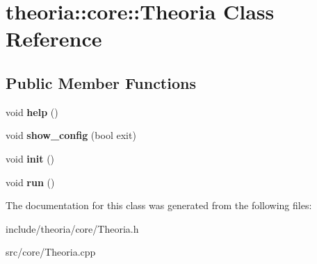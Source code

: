 \hypertarget{classtheoria_1_1core_1_1Theoria}{}\section{theoria\+:\+:core\+:\+:Theoria Class Reference}
\label{classtheoria_1_1core_1_1Theoria}
\subsection*{Public Member Functions}
\begin{DoxyCompactItemize}
\item 
\mbox{\label{classtheoria_1_1core_1_1Theoria_ae8537946e39ac2ec084332edd6ef0a9a}} 
void {\bfseries help} ()
\item 
\mbox{\label{classtheoria_1_1core_1_1Theoria_a353a71a3b26b77d814c99756a749bbdf}} 
void {\bfseries show\+\_\+config} (bool exit)
\item 
\mbox{\label{classtheoria_1_1core_1_1Theoria_a7c08abec5d2655e8779f81622406ccb7}} 
void {\bfseries init} ()
\item 
\mbox{\label{classtheoria_1_1core_1_1Theoria_a2792aa50eb3ec9a2bea5288097052a3f}} 
void {\bfseries run} ()
\end{DoxyCompactItemize}


The documentation for this class was generated from the following files\+:\begin{DoxyCompactItemize}
\item 
include/theoria/core/Theoria.\+h\item 
src/core/Theoria.\+cpp\end{DoxyCompactItemize}
